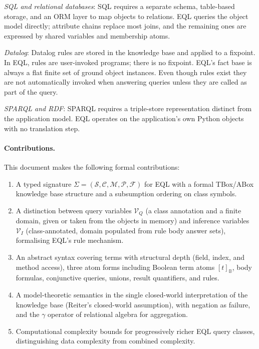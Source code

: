 \documentclass[11pt, a4paper]{article}
\theoremstyle{plain}
\theoremstyle{definition}
\theoremstyle{remark}
\begin{document}
\emph{SQL and relational databases}: SQL requires a separate schema, table-based
storage, and an ORM layer to map objects to relations.  EQL queries the object model directly;
attribute chains replace most joins, and the remaining ones are expressed by shared variables
and membership atoms.

\emph{Datalog}: Datalog rules are stored in the knowledge base and applied to a
fixpoint.  In EQL, rules are user-invoked programs; there is no fixpoint.  EQL's fact base is always a flat finite set of ground object instances. Even though rules exist they are not automatically invoked when answering queries unless they are called as part of the query.

\emph{SPARQL and RDF}: SPARQL requires a triple-store representation distinct from the
application model.  EQL operates on the application's own Python objects with no translation
step.

\paragraph{Contributions.}
This document makes the following formal contributions:
\begin{enumerate}
  \item A typed signature $\Sigma = (\mathcal{S}, \mathcal{C}, \mathcal{M}, \mathcal{P},
        \mathcal{F})$ for EQL with a formal TBox/ABox knowledge base structure and a
        subsumption ordering on class symbols.
  \item A distinction between query variables $\mathcal{V}_Q$ (a class annotation and a finite
        domain, given or taken from the objects in memory) and inference variables $\mathcal{V}_I$ (class-annotated,
        domain populated from rule body answer sets), formalising EQL's rule mechanism.
  \item An abstract syntax covering terms with structural depth (field, index, and method
        access), three atom forms including Boolean term atoms $[t]_\mathbb{B}$, body formulas,
        conjunctive queries, unions, result quantifiers, and rules.
  \item A model-theoretic semantics in the single closed-world interpretation of the knowledge
        base (Reiter's closed-world assumption), with negation as failure, and the $\gamma$
        operator of relational algebra for aggregation.
  \item Computational complexity bounds for progressively richer EQL query classes,
        distinguishing data complexity from combined complexity.
\end{enumerate}
\end{document}
